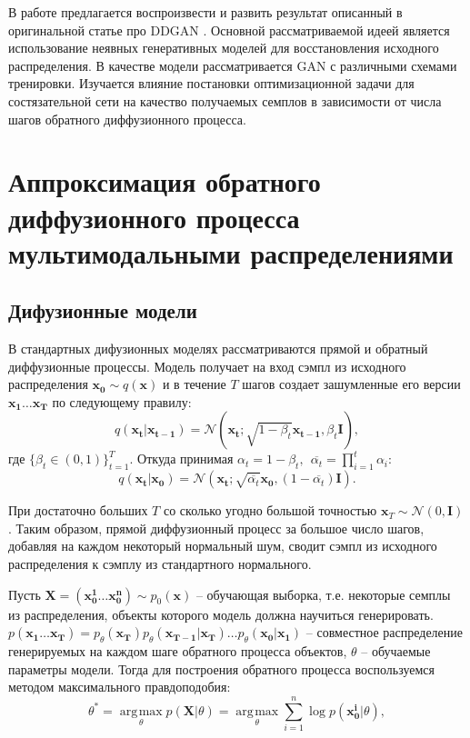 \documentclass{article}
\DeclareMathOperator*{\argmax}{\arg\!\max}
\begin{document}
 В работе предлагается воспроизвести и развить результат описанный в оригинальной статье про DDGAN \cite{https://doi.org/10.48550/arxiv.2112.07804}. Основной рассматриваемой идеей является использование неявных генеративных моделей для восстановления исходного распределения. В качестве модели рассматривается GAN с различными схемами тренировки. Изучается влияние постановки оптимизационной задачи для состязательной сети на качество получаемых семплов в зависимости от числа шагов обратного диффузионного процесса.
 
 
 \section{Аппроксимация обратного диффузионного процесса мультимодальными распределениями}
 \subsection{Дифузионные модели}
 В стандартных дифузионных моделях \cite{https://doi.org/10.48550/arxiv.1503.03585, https://doi.org/10.48550/arxiv.2006.11239} рассматриваются прямой и обратный диффузионные процессы. Модель получает на вход сэмпл из исходного распределения $\mathbf{x_0}\sim q(\mathbf{x})$ и в течение $T$ шагов создает зашумленные его версии $\mathbf{x_1}\dots \mathbf{x_T}$ по следующему правилу:
 \begin{equation}
 	q(\mathbf{x_t}|\mathbf{x_{t-1}}) = \mathcal{N}(\mathbf{x_t}; \sqrt{1-\beta_t}\mathbf{x_{t-1}}, \beta_t \mathbf{I}),
 \end{equation}
где $\{\beta_t \in (0, 1)\}_{t=1}^T$. Откуда принимая $\alpha_t = 1 - \beta_t,~~\overline{\alpha_t} = \prod_{i=1}^t \alpha_i$:
 \begin{equation}
	q(\mathbf{x_t}|\mathbf{x_0}) = \mathcal{N}(\mathbf{x_t}; \sqrt{\overline{\alpha_t}}\mathbf{x_0}, (1-\overline{\alpha_t})\mathbf{I}).
\end{equation}

При достаточно больших $T$ со сколько угодно большой точностью $\mathbf{x}_T\sim \mathcal{N}(0,\mathbf{I})$. Таким образом, прямой диффузионный процесс за большое число шагов, добавляя на каждом некоторый нормальный шум, сводит сэмпл из исходного распределения к сэмплу из стандартного нормального. 

Пусть $\mathbf{X} = (\mathbf{x_0^1}\dots \mathbf{x_0^n})\sim p_0(\mathbf{x})$ -- обучающая выборка, т.е. некоторые семплы из распределения, объекты которого модель должна научиться генерировать. $p(\mathbf{x_1}\dots \mathbf{x_T}) = p_\theta(\mathbf{x_T})p_\theta(\mathbf{x_{T-1}}|\mathbf{x_T})\dots p_\theta(\mathbf{x_0}|\mathbf{x_1})$ -- совместное распределение генерируемых на каждом шаге обратного процесса объектов, $\theta$ -- обучаемые параметры модели. Тогда для построения обратного процесса воспользуемся методом максимального правдоподобия:
 \begin{equation}
	\theta^* =\argmax\limits_{\theta} p(\mathbf{X}|\theta) = \argmax\limits_{\theta} \sum\limits_{i=1}^n \log{p(\mathbf{x_0^i}|\theta)},
\end{equation}
\end{document}
